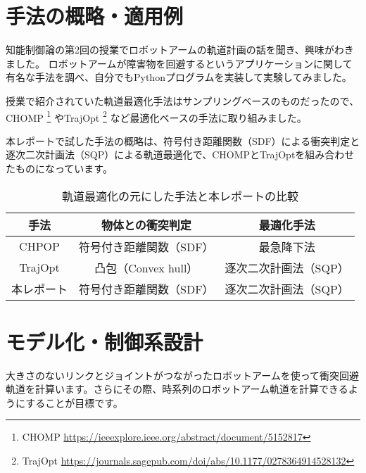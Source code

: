 
\section{手法の概略・適用例}

知能制御論の第2回の授業でロボットアームの軌道計画の話を聞き、興味がわきました。
ロボットアームが障害物を回避するというアプリケーションに関して有名な手法を調べ、自分でもPythonプログラムを実装して実験してみました。

授業で紹介されていた軌道最適化手法はサンプリングベースのものだったので、CHOMP
\footnote{CHOMP \url{https://ieeexplore.ieee.org/abstract/document/5152817}}
やTrajOpt
\footnote{TrajOpt \url{https://journals.sagepub.com/doi/abs/10.1177/0278364914528132}}
など最適化ベースの手法に取り組みました。

本レポートで試した手法の概略は、符号付き距離関数（SDF）による衝突判定と逐次二次計画法（SQP）による軌道最適化で、CHOMPとTrajOptを組み合わせたものになっています。

\begin{table}[htbp]
  \centering
  \begin{tabular}{c||c|c}
    手法 & 物体との衝突判定 & 最適化手法                         \\ \hline
    CHPOP      & 符号付き距離関数（SDF） & 最急降下法            \\
    TrajOpt    & 凸包（Convex hull）     & 逐次二次計画法（SQP） \\
    本レポート & 符号付き距離関数（SDF） & 逐次二次計画法（SQP） \\
  \end{tabular}
  \caption{軌道最適化の元にした手法と本レポートの比較}
  \label{table:compare}
\end{table}

\section{モデル化・制御系設計}
大きさのないリンクとジョイントがつながったロボットアームを使って衝突回避軌道を計算います。さらにその際、時系列のロボットアーム軌道を計算できるようにすることが目標です。

